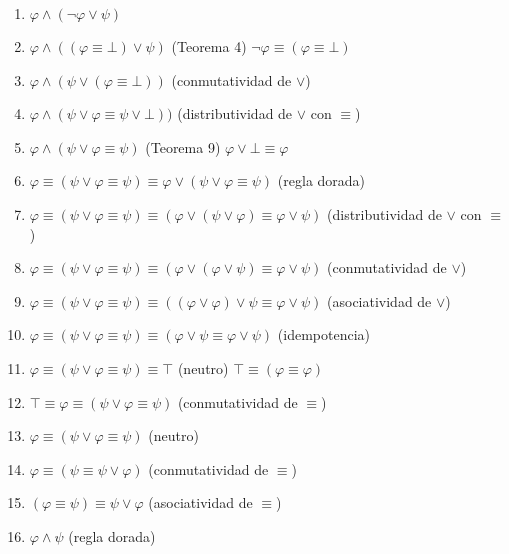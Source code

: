 \documentclass[a4paper,11pt]{article}
\begin{document}
\begin{enumerate}
    \item $\varphi \land (\neg\varphi \lor \psi)$
    \item $\varphi \land ((\varphi \equiv \bot)  \lor \psi)$ \hfill (Teorema 4) $\neg\varphi \equiv (\varphi \equiv \bot)$
    \item $\varphi \land (\psi \lor (\varphi \equiv \bot))$ \hfill (conmutatividad de $\lor$)
    \item $\varphi \land (\psi \lor \varphi \equiv \psi \lor \bot))$ \hfill (distributividad de $\lor$ con $\equiv$)
    \item $\varphi \land (\psi \lor \varphi \equiv \psi)$ \hfill (Teorema 9) $\varphi \lor \bot \equiv \varphi$
    \item $\varphi \equiv (\psi \lor \varphi \equiv \psi) \equiv \varphi \lor (\psi \lor \varphi \equiv \psi)$ \hfill (regla dorada)
    \item $\varphi \equiv (\psi \lor \varphi \equiv \psi) \equiv (\varphi \lor (\psi \lor \varphi) \equiv \varphi \lor \psi)$ \hfill (distributividad de $\lor$ con $\equiv$)
    \item $\varphi \equiv (\psi \lor \varphi \equiv \psi) \equiv (\varphi \lor (\varphi \lor \psi) \equiv \varphi \lor \psi)$ \hfill (conmutatividad de $\lor$)
    \item $\varphi \equiv (\psi \lor \varphi \equiv \psi) \equiv ((\varphi \lor \varphi) \lor \psi \equiv \varphi \lor \psi)$ \hfill (asociatividad de $\lor$)
    \item $\varphi \equiv (\psi \lor \varphi \equiv \psi) \equiv (\varphi \lor \psi \equiv \varphi \lor \psi)$ \hfill (idempotencia)

    \item $\varphi \equiv (\psi \lor \varphi \equiv \psi) \equiv \top$ \hfill (neutro) $\top \equiv (\varphi \equiv \varphi)$

    \item $\top \equiv \varphi \equiv (\psi \lor \varphi \equiv \psi)$ \hfill (conmutatividad de $\equiv$)

    \item $\varphi \equiv (\psi \lor \varphi \equiv \psi)$ \hfill (neutro)
    \item $\varphi \equiv (\psi \equiv \psi \lor \varphi)$ \hfill (conmutatividad de $\equiv$)
    \item $(\varphi \equiv \psi) \equiv \psi \lor \varphi$ \hfill (asociatividad de $\equiv$)
    \item $\varphi \land \psi$ \hfill (regla dorada)

\end{enumerate}
\end{document}
